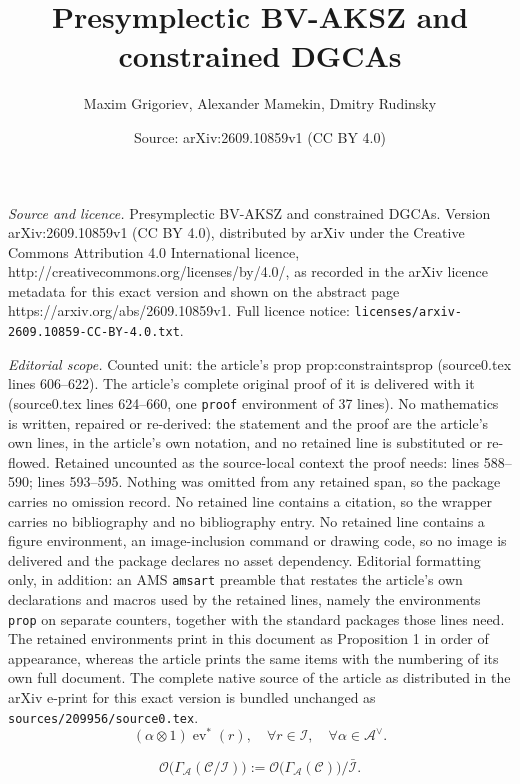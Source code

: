 \documentclass[10pt,a4paper]{amsart}
\title{Presymplectic BV-AKSZ and constrained DGCAs}
\author{Maxim Grigoriev, Alexander Mamekin, Dmitry Rudinsky}
\date{Source: arXiv:2609.10859v1 (CC BY 4.0)}
\newcommand{\alg}{\mathcal{O}}
\newcommand{\ev}{\operatorname{ev}}
\newcommand{\so}{\mathcal{A}}
\newcommand{\ta}{\mathcal{C}}
\begin{document}
\maketitle

\noindent\emph{Source and licence.} Presymplectic BV-AKSZ and constrained DGCAs. Version arXiv:2609.10859v1 (CC BY 4.0), distributed by arXiv under the Creative Commons Attribution 4.0 International licence, http://creativecommons.org/licenses/by/4.0/, as recorded in the arXiv licence metadata for this exact version and shown on the abstract page https://arxiv.org/abs/2609.10859v1. Full licence notice: \texttt{licenses/arxiv-2609.10859-CC-BY-4.0.txt}.\par\smallskip

\noindent\textit{Editorial scope.} Counted unit: the article's prop prop:constraintsprop (source0.tex lines 606--622). The article's complete original proof of it is delivered with it (source0.tex lines 624--660, one \texttt{proof} environment of 37 lines). No mathematics is written, repaired or re-derived: the statement and the proof are the article's own lines, in the article's own notation, and no retained line is substituted or re-flowed.  Retained uncounted as the source-local context the proof needs: lines 588--590; lines 593--595.  Nothing was omitted from any retained span, so the package carries no omission record.  No retained line contains a citation, so the wrapper carries no bibliography and no bibliography entry.  No retained line contains a figure environment, an image-inclusion command or drawing code, so no image is delivered and the package declares no asset dependency.  Editorial formatting only, in addition: an AMS \texttt{amsart} preamble that restates the article's own declarations and macros used by the retained lines, namely the environments \texttt{prop} on separate counters, together with the standard packages those lines need.  The retained environments print in this document as Proposition 1 in order of appearance, whereas the article prints the same items with the numbering of its own full document.  The complete native source of the article as distributed in the arXiv e-print for this exact version is bundled unchanged as \texttt{sources/209956/source0.tex}.
\begin{equation}\label{prolongideal}
   (\alpha\otimes 1)\ev^*(r),\quad \forall r\in \mathcal{I},\quad \forall \alpha\in\so^{\vee}.
\end{equation}

\begin{equation}\label{quotietnalg}
    \alg\big(\Gamma_{\so}(\ta/\mathcal{I})\big):=\alg\big(\Gamma_{\so}(\ta)\big)/\bar{\mathcal{I}}.
\end{equation}
\end{document}
